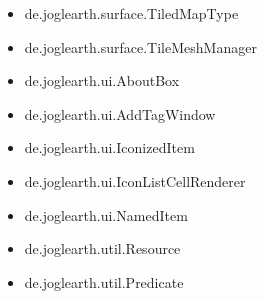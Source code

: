 \documentclass[10pt]{scrreprt}
\begin{document}
\begin{itemize}
\item de.joglearth.surface.TiledMapType
\item de.joglearth.surface.TileMeshManager
\item de.joglearth.ui.AboutBox
\item de.joglearth.ui.AddTagWindow
\item de.joglearth.ui.IconizedItem
\item de.joglearth.ui.IconListCellRenderer
\item de.joglearth.ui.NamedItem
\item de.joglearth.util.Resource
\item de.joglearth.util.Predicate
\end{itemize}
\end{document}
